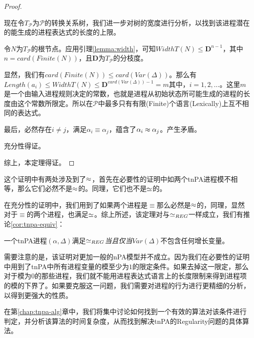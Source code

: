 \begin{proof}
\begin{itemize}
现在令$T_{\mathcal{P}}$为$\mathcal{P}$的转换关系树，我们进一步对树的宽度进行分析，以找到该进程潜在的能生成的进程表达式的长度的上限。

令$N$为$T_{\mathcal{P}}$的根节点。应用引理\ref{lemma:width}，可知$WidthT(N)\leq \mathbf{D}^{n-1}$，其中$n=card(Finite(N))$，且$\mathbf{D}$为$T_{\mathcal{P}}$的分枝度。

显然，我们有$card(Finite(N))\leq card(Var(\Delta))$。那么有$Length(a_i)\leq WidthT(N)\leq \mathbf{D}^{card(Var(\Delta))-1}=m$其中，$i=1,2,\ldots$。这里$m$是一个由输入进程规则决定的常数，也就是进程从初始状态所可能生成的进程的长度由这个常数所限定。所以在$\mathcal{P}$中最多只有有限(Finite)个语言(Lexically)上互不相同的表达式。

最后，必然存在$i\neq j$，满足$\alpha_i\equiv \alpha_j$，蕴含了$\alpha_i\approx \alpha_j$。产生矛盾。

充分性得证。
\end{itemize}
综上，本定理得证。
\end{proof}

这个证明中有两处涉及到了$\approx$，首先在必要性的证明中如两个tnPA进程模不相等，那么它们必然不是$\approx$的。同理，它们也不是$\simeq$的。

在充分性的证明中，我们用到了如果两个进程是$\equiv$那么必然是$\approx$的，同理，显然对于$\equiv$的两个进程，也满足$\simeq$。综上所述，该定理对与$\simeq_{REG}$一样成立，我们有推论\ref{cor:tnpa-equiv}：

\begin{cor}\label{cor:tnpa-equiv}
一个tnPA进程$(\alpha,\Delta)$满足$\simeq_{REG}$\emph{当且仅当}$Var(\Delta)$不包含任何增长变量。
\end{cor}

需要注意的是，该证明对更加一般的nPA模型并不成立。因为我们在必要性的证明中用到了tnPA中所有进程变量的模至少为$1$的限定条件。如果去掉这一限定，那么对于模为$0$的那些进程，我们就不能用进程表达式语言上的长度限制来得到进程项的模的下界了。如果要克服这一问题，我们需要对进程的行为进行更精细的分析，以得到更强大的性质。

在第\ref{chap:tnpa-alg}章中，我们将集中讨论如何找到一个有效的算法对该条件进行判定，并分析该算法的时间复杂度，从而找到解决tnPA的Regularity问题的具体算法。
